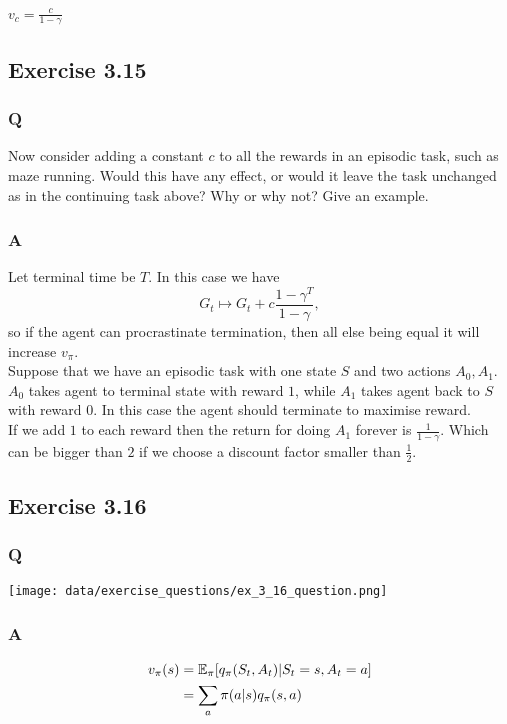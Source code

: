 $v_c = \frac{c}{1 - \gamma}$

\subsection{Exercise 3.15}
\subsubsection{Q}
Now consider adding a constant $c$ to all the rewards in an episodic task, such as maze running. Would this have any effect, or would it leave the task unchanged as in the continuing task above? Why or why not? Give an example.

\subsubsection{A}
Let terminal time be $T$. In this case we have 
\begin{equation}
    G_t \mapsto G_t + c\frac{1 - \gamma^T}{1 - \gamma},
\end{equation}
so if the agent can procrastinate termination, then all else being equal it will increase $v_\pi$.\\

Suppose that we have an episodic task with one state $S$ and two actions $A_0, A_1$. $A_0$ takes agent to terminal state with reward $1$, while $A_1$ takes agent back to $S$ with reward $0$. In this case the agent should terminate to maximise reward. \\ 

If we add $1$ to each reward then the return for doing $A_1$ forever is $\frac{1}{1-\gamma}$. Which can be bigger than $2$ if we choose a discount factor smaller than $\frac12$.

\subsection{Exercise 3.16}
\subsubsection{Q}
\texttt{[image: data/exercise\_questions/ex\_3\_16\_question.png]}
 
\subsubsection{A}
\begin{align*}
    v_\pi(s) & = \mathbb{E}_\pi[q_\pi(S_t, A_t) |S_t = s, A_t = a] \\ 
          & = \sum_a \pi(a|s) q_\pi(s, a)
\end{align*}

